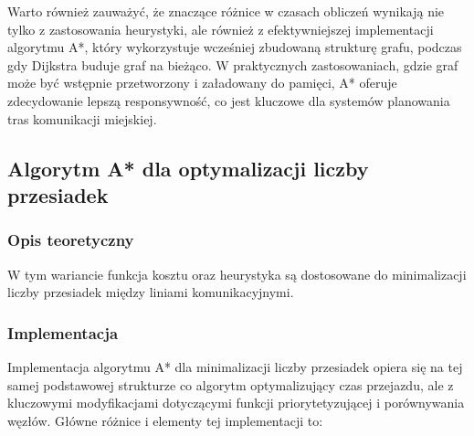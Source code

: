 \documentclass[12pt,a4paper]{article}
\begin{document}
Warto również zauważyć, że znaczące różnice w czasach obliczeń wynikają nie tylko z zastosowania heurystyki, ale również z efektywniejszej implementacji algorytmu A*, który wykorzystuje wcześniej zbudowaną strukturę grafu, podczas gdy Dijkstra buduje graf na bieżąco. W praktycznych zastosowaniach, gdzie graf może być wstępnie przetworzony i załadowany do pamięci, A* oferuje zdecydowanie lepszą responsywność, co jest kluczowe dla systemów planowania tras komunikacji miejskiej.

\subsection{Algorytm A* dla optymalizacji liczby przesiadek}
\subsubsection{Opis teoretyczny}
W tym wariancie funkcja kosztu oraz heurystyka są dostosowane do minimalizacji liczby przesiadek między liniami komunikacyjnymi.

\subsubsection{Implementacja}
Implementacja algorytmu A* dla minimalizacji liczby przesiadek opiera się na tej samej podstawowej strukturze co algorytm optymalizujący czas przejazdu, ale z kluczowymi modyfikacjami dotyczącymi funkcji priorytetyzującej i porównywania węzłów. Główne różnice i elementy tej implementacji to:
\end{document}
